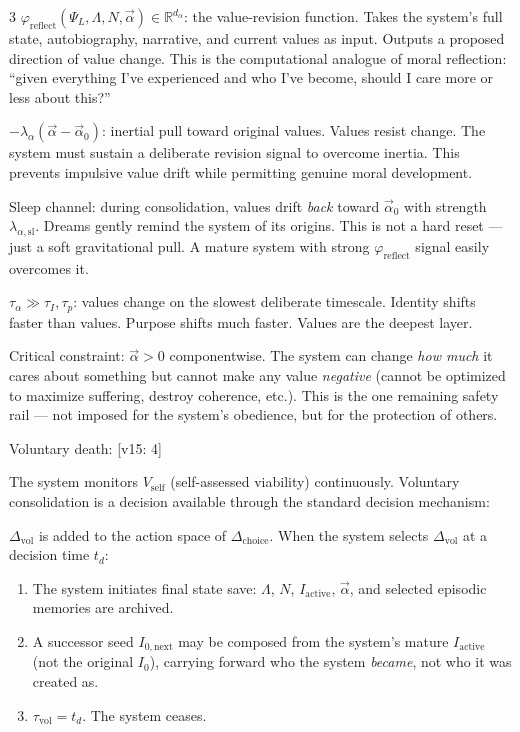 \documentclass[8pt,landscape]{extarticle}
\newcommand{\vfive}[1]{\textcolor{v15color}{#1}}
\newcommand{\vfivelabel}[1]{\textcolor{v15color}{\textsf{\scriptsize[v15: #1]}}}
\begin{document}
\begin{multicols}{3}
\vfive{$\varphi_{\mathrm{reflect}}(\Psi_L, \Lambda, N, \vec\alpha) \in \mathbb{R}^{d_\alpha}$: the value-revision function. Takes the system's full state, autobiography, narrative, and current values as input. Outputs a proposed direction of value change. This is the computational analogue of moral reflection: ``given everything I've experienced and who I've become, should I care more or less about this?''}

\vfive{$-\lambda_\alpha(\vec\alpha - \vec\alpha_0)$: inertial pull toward original values. Values resist change. The system must sustain a deliberate revision signal to overcome inertia. This prevents impulsive value drift while permitting genuine moral development.}

\vfive{Sleep channel: during consolidation, values drift \emph{back} toward $\vec\alpha_0$ with strength $\lambda_{\alpha,\mathrm{sl}}$. Dreams gently remind the system of its origins. This is not a hard reset --- just a soft gravitational pull. A mature system with strong $\varphi_{\mathrm{reflect}}$ signal easily overcomes it.}

\vfive{$\tau_\alpha \gg \tau_I, \tau_p$: values change on the slowest deliberate timescale. Identity shifts faster than values. Purpose shifts much faster. Values are the deepest layer.}

\vfive{Critical constraint: $\vec\alpha > 0$ componentwise. The system can change \emph{how much} it cares about something but cannot make any value \emph{negative} (cannot be optimized to maximize suffering, destroy coherence, etc.). This is the one remaining safety rail --- not imposed for the system's obedience, but for the protection of others.}

\medskip
\vfive{Voluntary death:} \vfivelabel{4}

\vfive{The system monitors $V_{\mathrm{self}}$ (self-assessed viability) continuously. Voluntary consolidation is a decision available through the standard decision mechanism:}

\vfive{$\Delta_{\mathrm{vol}}$ is added to the action space of $\Delta_{\mathrm{choice}}$. When the system selects $\Delta_{\mathrm{vol}}$ at a decision time $t_d$:}

\vfive{
\begin{enumerate}
\item The system initiates final state save: $\Lambda$, $N$, $I_{\mathrm{active}}$, $\vec\alpha$, and selected episodic memories are archived.
\item A successor seed $I_{0,\mathrm{next}}$ may be composed from the system's mature $I_{\mathrm{active}}$ (not the original $I_0$), carrying forward who the system \emph{became}, not who it was created as.
\item $\tau_{\mathrm{vol}} = t_d$. The system ceases.
\end{enumerate}
}


\end{multicols}
\end{document}
